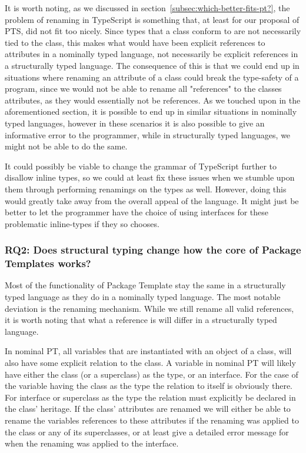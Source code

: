 It is worth noting, as we discussed in section~\vref{subsec:which-better-fits-pt?}, the problem of renaming in TypeScript is something that, at least for our proposal of PTS, did not fit too nicely.
Since types that a class conform to are not necessarily tied to the class, this makes what would have been explicit references to attributes in a nominally typed language, not necessarily be explicit references in a structurally typed language.
The consequence of this is that we could end up in situations where renaming an attribute of a class could break the type-safety of a program, since we would not be able to rename all "references" to the classes attributes, as they would essentially not be references.
As we touched upon in the aforementioned section, it is possible to end up in similar situations in nominally typed languages, however in these scenarios it is also possible to give an informative error to the programmer, while in structurally typed languages, we might not be able to do the same.

It could possibly be viable to change the grammar of TypeScript further to disallow inline types, so we could at least fix these issues when we stumble upon them through performing renamings on the types as well.
However, doing this would greatly take away from the overall appeal of the language.
It might just be better to let the programmer have the choice of using interfaces for these problematic inline-types if they so chooses.

\subsubsection{RQ2: Does structural typing change how the core of Package Templates works?}

Most of the functionality of Package Template stay the same in a structurally typed language as they do in a nominally typed language.
The most notable deviation is the renaming mechanism.
While we still rename all valid references, it is worth noting that what a reference is will differ in a structurally typed language.

In nominal PT, all variables that are instantiated with an object of a class, will also have some explicit relation to the class.
A variable in nominal PT will likely have either the class (or a superclass) as the type, or an interface.
For the case of the variable having the class as the type the relation to itself is obviously there.
For interface or superclass as the type the relation must explicitly be declared in the class' heritage.
If the class' attributes are renamed we will either be able to rename the variables references to these attributes if the renaming was applied to the class or any of its superclasses, or at least give a detailed error message for when the renaming was applied to the interface.


